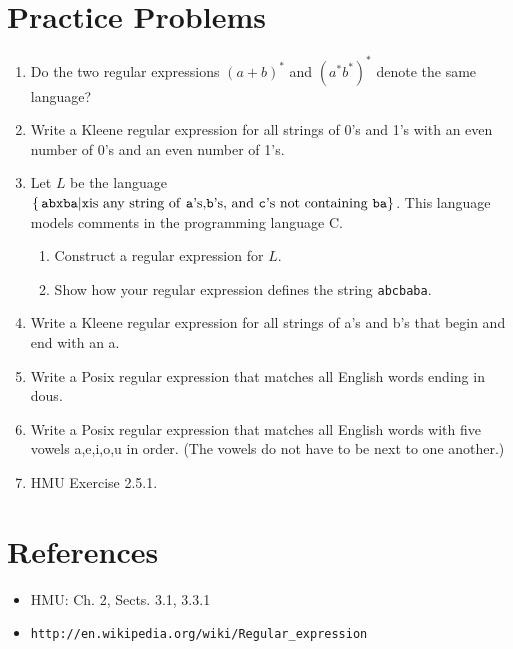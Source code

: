 \documentclass[]{article}
\begin{document}
\section{Practice Problems}
  \begin{enumerate}
    \item Do the two regular expressions $(a + b)^*$ and $(a^*b^*)^*$ denote the
          same language?
    \item Write a Kleene regular expression for all strings of 0's and 1's with
          an even number of 0's and an even number of 1's.
    \item Let $L$ be the language $\{ \, \texttt{abxba} | \texttt{x} \text{is
          any string of \texttt{a}'s,\texttt{b}'s, and \texttt{c}'s not
          containing \texttt{ba}} \}$. This language models comments in the
          programming language C.
      \begin{enumerate}
        \item Construct a regular expression for $L$.
        \item Show how your regular expression defines the string
              \texttt{abcbaba}.
      \end{enumerate}
    \item Write a Kleene regular expression for all strings of a's and b's that
          begin and end with an a.
    \item Write a Posix regular expression that matches all English words ending
          in dous.
    \item Write a Posix regular expression that matches all English words with
          five vowels a,e,i,o,u in order. (The vowels do not have to be next to
          one another.)
    \item HMU Exercise 2.5.1.
  \end{enumerate}

\section{References}
  \begin{itemize}
    \item HMU: Ch. 2, Sects. 3.1, 3.3.1
    \item \verb|http://en.wikipedia.org/wiki/Regular_expression|
  \end{itemize}
\end{document}
